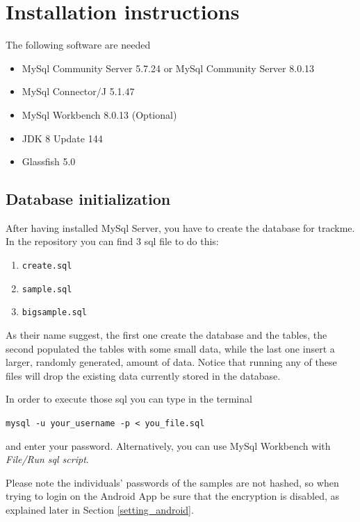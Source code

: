 \section{Installation instructions}
The following software are needed

\begin{itemize}
\item MySql Community Server  5.7.24 or MySql Community Server 8.0.13
\item MySql Connector/J 5.1.47
\item MySql Workbench 8.0.13 (Optional)
\item JDK 8 Update 144
\item Glassfish 5.0
\end{itemize}




\subsection{Database initialization}
After having installed MySql Server, you have to create the database for trackme.
In the repository you can find 3 sql file to do this:

\begin{enumerate}
\item \texttt{create.sql}
\item \texttt{sample.sql}
\item \texttt{bigsample.sql}
\end{enumerate}
As their name suggest, the first one create the database and the tables, the second populated the tables with some small data, while the last one insert a larger, randomly generated, amount of data.
Notice that running any of these files will drop the existing data currently stored in the database.
\vspace{1em}

\noindent 
In order to execute those sql you can type in the terminal

\begin{center}
\texttt{mysql -u your\_username -p \textless\ you\_file.sql}
\end{center}
and enter your password.
Alternatively, you can use MySql Workbench with \textit{File/Run sql script}.
\vspace{1em}

\noindent
Please note the individuals' passwords of the samples are not hashed, so when trying to login on the Android App be sure that the encryption is disabled, as explained later in Section \ref{setting_android}.


